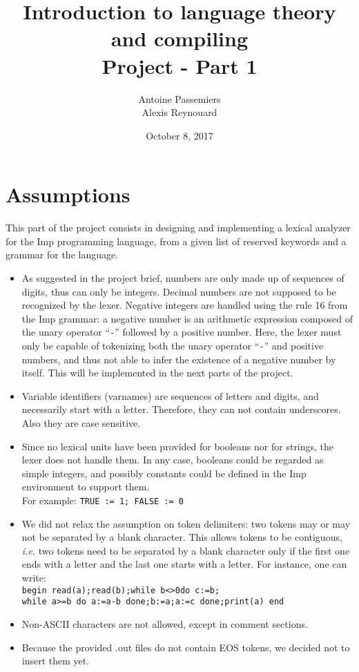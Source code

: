 \documentclass[12pt]{report}
\title{Introduction to language theory and compiling \\ Project - Part 1}
\author{Antoine Passemiers \\ Alexis Reynouard}
\date{October 8, 2017}
\begin{document}
\maketitle
\setcounter{tocdepth}{3}
\setcounter{secnumdepth}{3}
\setcounter{chapter}{0}
\tableofcontents
\pagebreak
\clearpage
\setcounter{page}{1}

\chapter{Assumptions}

This part of the project consists in designing and implementing a lexical analyzer for the Imp programming language,
from a given list of reserved keywords and a grammar for the language.

\begin{itemize}
  \item As suggested in the project brief, numbers are only made up of sequences of digits, thus can only
    be integers. Decimal numbers are not supposed to be recognized by the lexer. Negative integers are handled using
    the rule 16 from the Imp grammar: a negative number is an arithmetic expression composed of the unary operator
    ``\texttt{-}'' followed by a positive number. Here, the lexer must only be capable of tokenizing both the unary
    operator ``\texttt{-}'' and positive numbers, and thus not able to infer the existence of a negative number by itself. This
    will be implemented in the next parts of the project.
  \item Variable identifiers (varnames) are sequences of letters and digits, and necessarily start with a letter.  
    Therefore, they can not contain underscores. Also they are case sensitive.
  \item Since no lexical units have been provided for
    booleans nor for strings, the lexer does not handle them. In any case, booleans could be regarded as simple
    integers, and possibly constants could be defined in the Imp environment to support them. \\ For example:
    \texttt{TRUE := 1; FALSE := 0}
  \item We did not relax the assumption on token delimiters: two tokens may or may not be
    separated by a blank character. This allows tokens to be contiguous, \textit{i.e.} two tokens need to be separated
    by a blank character only if the first one ends with a letter and the last one starts with a letter.
    For instance, one can write:\\
    \texttt{begin read(a);read(b);while b<>0do c:=b;\\while a>=b do a:=a-b done;b:=a;a:=c done;print(a) end}
  \item Non-ASCII characters are not allowed, except in comment sections.
  \item Because the provided .out files do not contain EOS tokens, we decided not to insert them yet.
\end{itemize}
\end{document}
